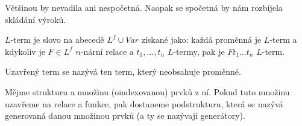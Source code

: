 \documentclass[12pt]{article}                   %
\begin{document}
        \begin{poznamka}
            Většinou by nevadila ani nespočetná. Naopak se spočetná by nám rozbíjela skládání výroků.
        \end{poznamka}

        \begin{definice}[Termy]
            $L$-term je slovo na abecedě $L^f \cup Var$ získané jako: každá proměnná je $L$-term a kdykoliv je $F \in L^f$ $n$-nární relace a $t_1, …, t_n$ $L$-termy, pak je $Ft_1…t_n$ $L$-term.
        \end{definice}

        \begin{definice}
            Uzavřený term se nazývá ten term, který neobsahuje proměnné.
        \end{definice}

        \begin{definice}[Generátory]
            Mějme strukturu a množinu (oindexovanou) prvků z ní. Pokud tuto množinu uzavřeme na relace a funkce, pak dostaneme podstrukturu, která se nazývá generovaná danou množinou prvků (a ty se nazývají generátory).
        \end{definice}
\end{document}

